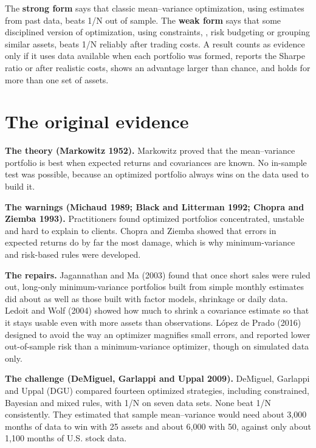 The \textbf{strong form} says that classic mean--variance optimization, using estimates from past data, beats 1/N out of sample. The \textbf{weak form} says that some disciplined version of optimization, using constraints, , risk budgeting or grouping similar assets, beats 1/N reliably after trading costs. A result counts as evidence only if it uses data available when each portfolio was formed, reports the Sharpe ratio or  after realistic costs, shows an advantage larger than chance, and holds for more than one set of assets.

\section{The original evidence}
\label{sec:12-evidence}

\textbf{The theory (Markowitz 1952).} Markowitz proved that the mean--variance portfolio is best when expected returns and covariances are known. No in-sample test was possible, because an optimized portfolio always wins on the data used to build it.

\textbf{The warnings (Michaud 1989; Black and Litterman 1992; Chopra and Ziemba 1993).} Practitioners found optimized portfolios concentrated, unstable and hard to explain to clients. Chopra and Ziemba showed that errors in expected returns do by far the most damage, which is why minimum-variance and risk-based rules were developed.

\textbf{The repairs.} Jagannathan and Ma (2003) found that once short sales were ruled out, long-only minimum-variance portfolios built from simple monthly estimates did about as well as those built with factor models, shrinkage or daily data. Ledoit and Wolf (2004) showed how much to shrink a covariance estimate so that it stays usable even with more assets than observations. L\'opez de Prado (2016) designed  to avoid the way an optimizer magnifies small errors, and reported lower out-of-sample risk than a minimum-variance optimizer, though on simulated data only.

\textbf{The challenge (DeMiguel, Garlappi and Uppal 2009).} DeMiguel, Garlappi and Uppal (DGU) compared fourteen optimized strategies, including constrained, Bayesian and mixed rules, with 1/N on seven data sets. None beat 1/N consistently. They estimated that sample mean--variance would need about 3,000 months of data to win with 25 assets and about 6,000 with 50, against only about 1,100 months of U.S. stock data.


